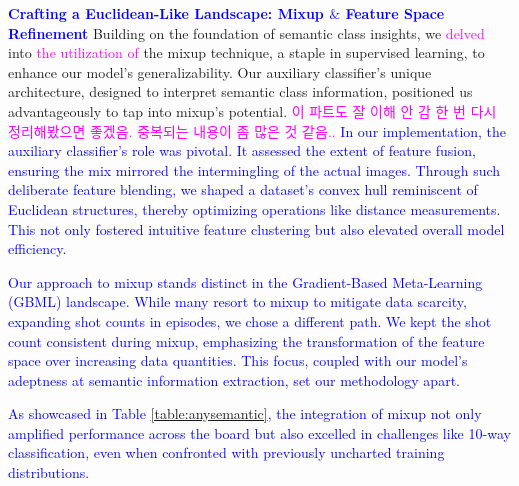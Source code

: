 \documentclass[letterpaper]{article} %
\newcommand{\jh}[1]{\textcolor{blue}{#1}}
\newcommand{\yr}[1]{\textcolor{magenta}{#1}}
\begin{document}
{\textbf{\jh{Crafting a Euclidean-Like Landscape: Mixup $\&$ Feature Space Refinement}} 
%
Building on the foundation of semantic class insights, we \yr{delved} into \yr{the utilization of} %
the mixup technique, a staple in supervised learning, to enhance our model's generalizability. Our auxiliary classifier's unique architecture, designed to interpret semantic class information, positioned us advantageously to tap into mixup's potential.
\yr{이 파트도 잘 이해 안 감 한 번 다시 정리해봤으면 좋겠음. 중복되는 내용이 좀 많은 것 같음..}
\jh{In our implementation, the auxiliary classifier's role was pivotal. It assessed the extent of feature fusion, ensuring the mix mirrored the intermingling of the actual images. Through such deliberate feature blending, we shaped a dataset's convex hull reminiscent of Euclidean structures, thereby optimizing operations like distance measurements. This not only fostered intuitive feature clustering but also elevated overall model efficiency.}

\jh{Our approach to mixup stands distinct in the Gradient-Based Meta-Learning (GBML) landscape. While many resort to mixup to mitigate data scarcity, expanding shot counts in episodes, we chose a different path. We kept the shot count consistent during mixup, emphasizing the transformation of the feature space over increasing data quantities. This focus, coupled with our model's adeptness at semantic information extraction, set our methodology apart.} 

\jh{As showcased in Table \ref{table:anysemantic}, the integration of mixup not only amplified performance across the board but also excelled in challenges like 10-way classification, even when confronted with previously uncharted training distributions.}

\subsection{}

}
\end{document}
